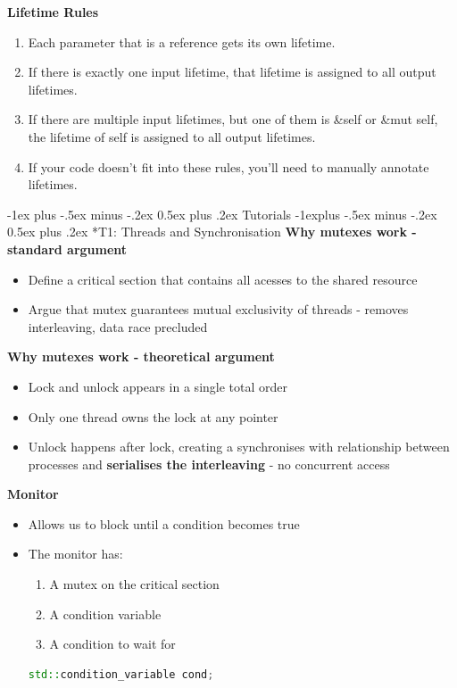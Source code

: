 \documentclass[10pt, landscape]{article}
\makeatletter
\renewcommand{\section}{\@startsection{section}{1}{0mm}%
                                {-1ex plus -.5ex minus -.2ex}%
                                {0.5ex plus .2ex}%
                                {\normalfont\large\bfseries}}
\renewcommand{\subsection}{\@startsection{subsection}{2}{0mm}%
                                {-1explus -.5ex minus -.2ex}%
                                {0.5ex plus .2ex}%
                                {\normalfont\normalsize\bfseries}}
\makeatother
\begin{document}
\begin{multicols}{4}
\textbf{Lifetime Rules}\\
\begin{enumerate}
    \item Each parameter that is a reference gets its own lifetime.
    \item If there is exactly one input lifetime, that lifetime is assigned to all output lifetimes.
    \item If there are multiple input lifetimes, but one of them is \&self or \&mut self, the lifetime of self is assigned to all output lifetimes.
    \item If your code doesn't fit into these rules, you'll need to manually annotate lifetimes.
\end{enumerate}

\pagebreak
\section{Tutorials}
\subsection*{T1: Threads and Synchronisation}
\textbf{Why mutexes work - standard argument}\\ 
\begin{itemize}
    \item Define a critical section that contains all acesses to the shared resource 
    \item Argue that mutex guarantees mutual exclusivity of threads - removes interleaving, data race precluded
\end{itemize}

\textbf{Why mutexes work - theoretical argument}\\
\begin{itemize}
    \item Lock and unlock appears in a single total order
    \item Only one thread owns the lock at any pointer
    \item Unlock happens after lock, creating a synchronises with relationship between processes and \textbf{serialises the interleaving} - no concurrent access
\end{itemize}


\textbf{Monitor} \\
\begin{itemize}
    \item Allows us to block until a condition becomes true
    \item The monitor has: 
    \begin{enumerate}
        \item A mutex on the critical section
        \item A condition variable
        \item A condition to wait for 
    \end{enumerate}
    \begin{lstlisting}[language=C++, breaklines=true, breakatwhitespace=true]
std::condition_variable cond;


\end{lstlisting}
\end{itemize}
\end{multicols}
\end{document}
